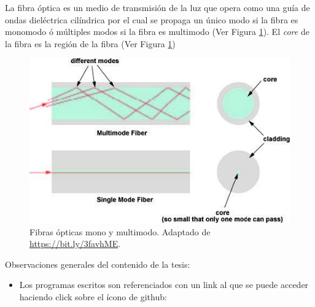 La fibra óptica es un medio de transmisión de la luz que opera como una guía de ondas dieléctrica cilíndrica por el cual se propaga un único modo si la fibra es monomodo ó múltiples modos si la fibra es multimodo (Ver Figura \ref{fig:guiasmon}). El \textit{core} de la fibra es la región de la fibra (Ver Figura \ref{fig:guiasmon})

\begin{figure}[H]
	\centering
	\includegraphics[scale=1.0]{Figs/introduccion/guias.jpg}
	\caption{Fibras ópticas mono y multimodo. Adaptado de \href{https://bit.ly/3favhME}{https://bit.ly/3favhME}.}
	\label{fig:guiasmon}
\end{figure}


Observaciones generales del contenido de la tesis:
\begin{itemize}
\item Los programas escritos son referenciados con un link al que se puede acceder haciendo click sobre el ícono de github: \faGithub
\end{itemize}